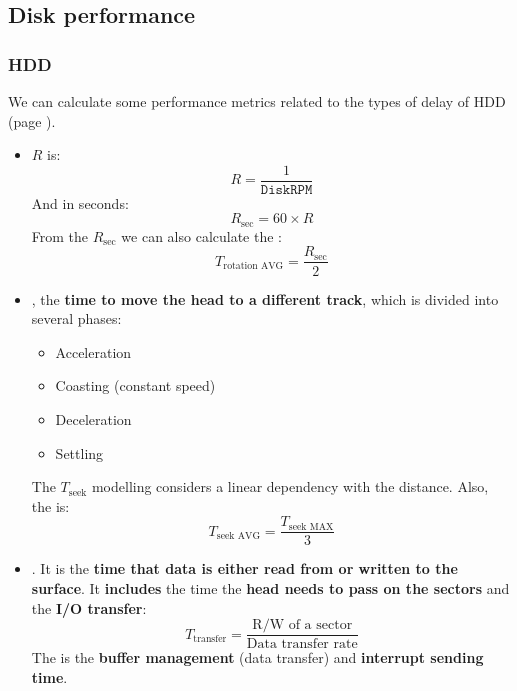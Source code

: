 \subsection{Disk performance}

\subsubsection{HDD}

We can calculate some performance metrics related to the types of delay of HDD (page \pageref{four types of hdd delay}).
\begin{itemize}
    \item {} $R$ is:
    \begin{equation}
        R = \dfrac{1}{\texttt{DiskRPM}}
    \end{equation}
    And in seconds:
    \begin{equation}
        R_{\text{sec}} = 60 \times R
    \end{equation}
    From the $R_{\text{sec}}$ we can also calculate the :
    \begin{equation}
        T_{\text{rotation AVG}} = \dfrac{R_{\text{sec}}}{2}
    \end{equation}

    \item {}, the \textbf{time to move the head to a different track}, which is divided into several phases:
    \begin{itemize}
        \item Acceleration
        \item Coasting (constant speed)
        \item Deceleration
        \item Settling
    \end{itemize}
    The $T_{\text{seek}}$ modelling considers a linear dependency with the distance. Also, the  is:
    \begin{equation}
        T_{\text{seek AVG}} = \dfrac{T_{\text{seek MAX}}}{3}
    \end{equation}

    \item {}. It is the \textbf{time that data is either read from or written to the surface}. It \textbf{includes} the time the \textbf{head needs to pass on the sectors} and the \textbf{I/O transfer}:
    \begin{equation}
        T_{\text{transfer}} = \dfrac{\text{R/W of a sector}}{\text{Data transfer rate}}
    \end{equation}
    The  is the \textbf{buffer management} (data transfer) and \textbf{interrupt sending time}.


\end{itemize}
